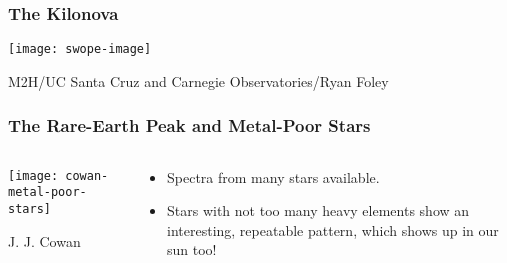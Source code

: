 \documentclass[]{beamer}
\begin{document}
\begin{frame}
  \frametitle{The Kilonova}
  \begin{center}
    \texttt{[image: swope-image]}
  \end{center}
  M2H/UC Santa Cruz and Carnegie Observatories/Ryan Foley
\end{frame}

\begin{frame}
  \frametitle{The Rare-Earth Peak and Metal-Poor Stars}
  \begin{columns}
    \begin{column}{6cm}
      \begin{center}
        \texttt{[image: cowan-metal-poor-stars]}
      \end{center}
      J. J. Cowan
    \end{column}
    \begin{column}{6cm}
      \begin{itemize}
      \item Spectra from many stars available.
      \item Stars with not too many heavy elements show an interesting,
        repeatable pattern, which shows up in our sun too!
      \end{itemize}      
    \end{column}
  \end{columns}
\end{frame}
\end{document}
